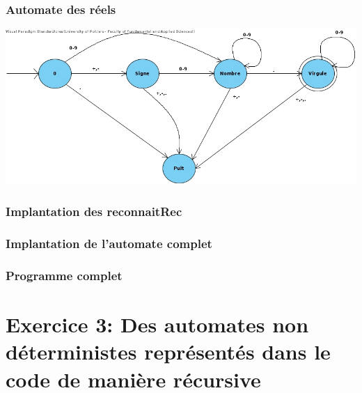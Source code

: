 \documentclass[./standalone.tex]{subfiles}
\begin{document}
\subsubsection{Automate des réels}
\medskip
\begin{center}
	\includegraphics[scale=0.5]{../VP/ex2_2.jpg}
\end{center}
\newpage

\subsubsection{Implantation des reconnaitRec}

\newpage

\subsubsection{Implantation de l'automate complet}



\subsubsection{Programme complet}

\newpage




\section{Exercice 3: Des automates non déterministes représentés dans le code de manière récursive}
\bigskip
\end{document}

